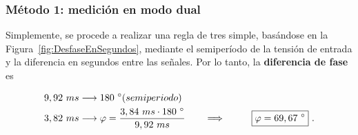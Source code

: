     \subsubsection*{Método 1: medición en modo dual}
    Simplemente, se procede a realizar una regla de tres simple, basándose en la Figura~\ref{fig:DesfaseEnSegundos}, mediante el
    semiperíodo de la tensión de entrada y la diferencia en segundos entre las señales. Por lo tanto, la \textbf{diferencia de
    fase} es

    \begin{align*}
      9,92\ ms &\longrightarrow 180\ ^{\circ} (semiperiodo) \\
      3,82\ ms &\longrightarrow \varphi = \dfrac{3,84\ ms \cdot 180\ ^{\circ}}{9,92\ ms} \hspace{20pt} \Longrightarrow \hspace{20pt} \Aboxed{\varphi=69,67\ ^{\circ}}\ .
    \end{align*}

